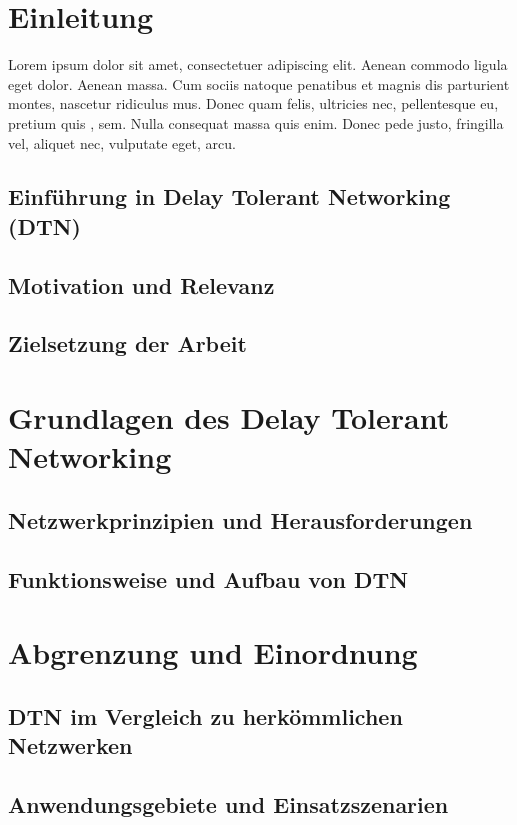 \documentclass[paper=a4,fontsize=12pt,ngerman]{scrartcl}
\begin{document}
\clearpage
{}

\section{Einleitung}
Lorem ipsum dolor sit amet, consectetuer adipiscing elit. Aenean commodo 
ligula eget dolor. Aenean massa. Cum sociis natoque penatibus et magnis dis 
parturient montes, nascetur ridiculus mus. Donec quam felis, ultricies nec, 
pellentesque eu, pretium quis \cite{ahu61}, sem. Nulla consequat massa quis 
enim. Donec pede justo, fringilla vel, aliquet nec, vulputate eget, arcu.

\subsection{Einführung in Delay Tolerant Networking (DTN) }

\subsection{Motivation und Relevanz}

\subsection{Zielsetzung der Arbeit}

\section{Grundlagen des Delay Tolerant Networking}

\subsection{Netzwerkprinzipien und Herausforderungen}
\subsection{Funktionsweise und Aufbau von DTN}

\section{Abgrenzung und Einordnung}
\subsection{DTN im Vergleich zu herkömmlichen Netzwerken}
\subsection{Anwendungsgebiete und Einsatzszenarien}
\end{document}

